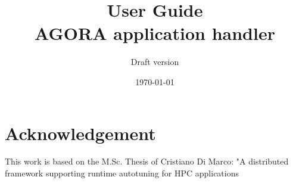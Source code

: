 \documentclass[11pt,a4paper,titlepage]{article}
\title{ \blue User Guide \\
	\blueb AGORA application handler}
\author{Draft version}
\date{\today}
\begin{document}
\maketitle
\thispagestyle{empty}

\tableofcontents


\clearpage
\pagestyle{plain}
\setcounter{page}{1}







\section{Acknowledgement}
This work is based on the M.Sc. Thesis of Cristiano Di Marco: "A distributed framework supporting runtime autotuning for HPC applications
\end{document}
